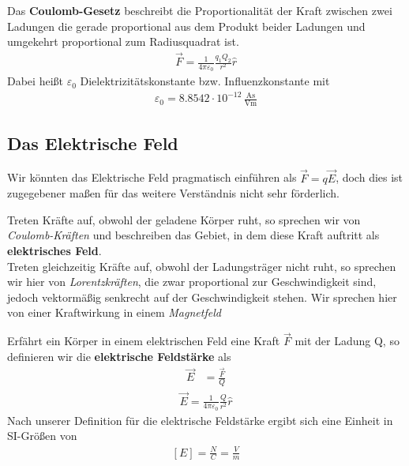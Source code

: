 Das \textbf{Coulomb-Gesetz} beschreibt die Proportionalität der Kraft zwischen zwei Ladungen die gerade proportional aus dem Produkt beider Ladungen und umgekehrt proportional zum Radiusquadrat ist.
\begin{align} \label{eqn:Coulomb-Gesetz}
\boxed{ \vec{F} = \frac{1}{4\pi \varepsilon_{0}} \frac{q_1 Q_2}{r^2} \hat{r}}
\end{align}Dabei heißt $\varepsilon_{0}$ Dielektrizitätskonstante bzw. Influenzkonstante mit\begin{align*}
\varepsilon_{0} = 8.8542 \cdot 10^{-12} \,\mathrm{ \frac{As}{Vm}}
\end{align*}
\subsection{Das Elektrische Feld}
Wir könnten das Elektrische Feld pragmatisch einführen als $\vec{F} = q\vec{E}$, doch dies ist zugegebener maßen für das weitere Verständnis nicht sehr förderlich. \par
Treten Kräfte auf, obwohl der geladene Körper ruht, so sprechen wir von \textit{Coulomb-Kräften} und beschreiben das Gebiet, in dem diese Kraft auftritt als \textbf{elektrisches Feld}. \\Treten gleichzeitig Kräfte auf, obwohl der Ladungsträger nicht ruht, so sprechen wir hier von \textit{Lorentzkräften}, die zwar proportional zur Geschwindigkeit sind, jedoch vektormäßig senkrecht auf der Geschwindigkeit stehen. Wir sprechen hier von einer Kraftwirkung in einem \textit{Magnetfeld} \par
Erfährt ein Körper in einem elektrischen Feld eine Kraft $\vec{F}$ mit der Ladung Q, so definieren wir die \textbf{elektrische Feldstärke} als \begin{align}
\vec{E} &= \frac{\vec{F}}{Q} 
\end{align}\begin{align} \label{eqn:elFeldstärke}
		\boxed{\vec{E}= \frac{1}{4\pi \varepsilon_{0}} \frac{Q}{r^2} \hat{r}}
\end{align} Nach unserer Definition für die elektrische Feldstärke ergibt sich eine Einheit in SI-Größen von \begin{align}\left[ E\right] = \frac{N}{C} = \frac{V}{m}
\end{align}
